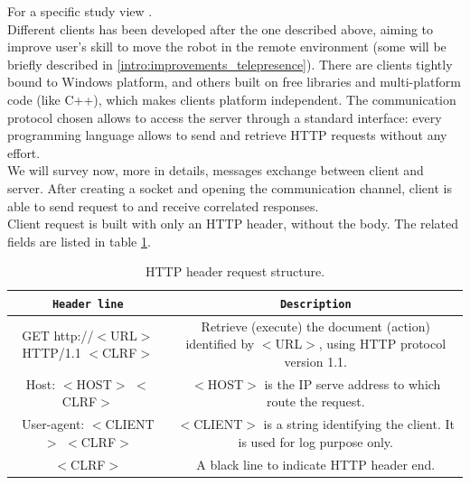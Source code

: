 For a specific study view \cite{morduc:neri}.
\\
Different clients has been developed after the one described above, aiming to
improve user's skill to move the robot in the remote environment
(some will be briefly described in \ref{intro:improvements_telepresence}). There are
clients tightly bound to Windows platform, and others
built on free libraries and multi-platform code (like C++), which makes clients
platform independent. The communication protocol chosen allows to
access the server through a standard interface: every programming language
allows to send and retrieve HTTP requests without any effort.
\\
We will survey now, more in details, messages exchange between client and server.
After creating a socket and opening the communication channel, client is able
to send request to \morduc{} and receive correlated responses.
\\
Client request is built with only an HTTP header, without the body. The related
fields are listed in table \ref{table:header_request}.

\begin{table}[h]
  \centering  
  \begin{tabular}{| c | c |}

    \hline
    \texttt{\bf Header line} &
    \texttt{\bf Description} \\ %

    \hline
    \parbox[t]{6.5cm}{\raggedright \small GET http://$<$URL$>$ HTTP/1.1 $<$CLRF$>$} &
    \parbox[t]{6cm}{\raggedright \small
      Retrieve (execute) the document (action) identified by $<$URL$>$,
      using HTTP protocol version 1.1.} \\  [1ex]

    \hline
    \parbox[t]{6.5cm}{\raggedright \small Host: $<$HOST$>$ $<$CLRF$>$} &
    \parbox[t]{6cm}{\raggedright \small
      $<$HOST$>$ is the IP serve address to which route the request.} \\ [1ex]
    
    \hline
    \parbox[t]{6.5cm}{\raggedright \small User-agent:  $<$CLIENT$>$ $<$CLRF$>$} &
    \parbox[t]{6cm}{\raggedright \small
      $<$CLIENT$>$ is a string identifying the client. It is used for log
      purpose only.} \\  [1ex]

    \hline
    \parbox[t]{6.5cm}{\raggedright \small $<$CLRF$>$} &
    \parbox[t]{6cm}{\raggedright \small
      A black line to indicate HTTP header end.} \\ [1ex]

    \hline

  \end{tabular}
  \caption{HTTP header request structure.}
  \label{table:header_request}
\end{table}

